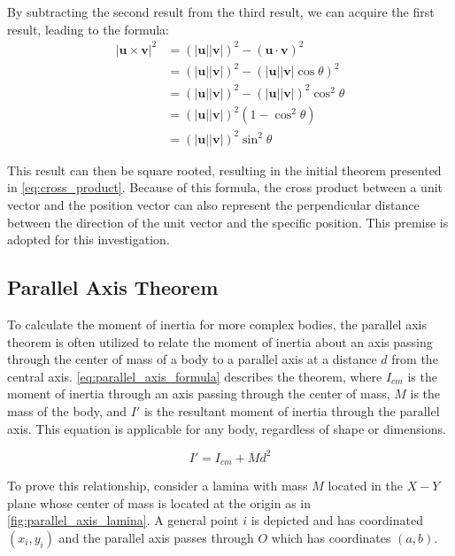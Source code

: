By subtracting the second result from the third result, we can acquire the first result, leading to the formula:
\begin{align*}
|\bm{u} \times \bm{v}|^2 &= (|\bm{u}||\bm{v}|)^2 - (\bm{u} \cdot \bm{v})^2 \\
&= (|\bm{u}||\bm{v}|)^2 - (|\bm{u}||\bm{v}|\cos{\theta})^2 \\
&= (|\bm{u}||\bm{v}|)^2 - (|\bm{u}||\bm{v}|)^2\cos^2{\theta} \\
&= (|\bm{u}||\bm{v}|)^2(1 - \cos^2{\theta}) \\
&= (|\bm{u}||\bm{v}|)^2\sin^2{\theta}
\end{align*}

This result can then be square rooted, resulting in the initial theorem presented in \cref{eq:cross_product}. Because of this formula, the cross product between a unit vector and the position vector can also represent the perpendicular distance between the direction of the unit vector and the specific position. This premise is adopted for this investigation.

\subsection{Parallel Axis Theorem}

To calculate the moment of inertia for more complex bodies, the parallel axis theorem is often utilized to relate the moment of inertia about an axis passing through the center of mass of a body to a parallel axis at a distance $d$ from the central axis. \cref{eq:parallel_axis_formula} describes the theorem, where $I_{cm}$ is the moment of inertia through an axis passing through the center of mass, $M$ is the mass of the body, and $I'$ is the resultant moment of inertia through the parallel axis. This equation is applicable for any body, regardless of shape or dimensions.

\begin{equation}
I' = I_{cm} + Md^2
\label{eq:parallel_axis_formula}
\end{equation}

To prove this relationship, consider a lamina with mass $M$ located in the $X-Y$ plane whose center of mass is located at the origin as in \cref{fig:parallel_axis_lamina}. A general point $i$ is depicted and has coordinated $(x_i, y_i)$ and the parallel axis passes through $O$ which has coordinates $(a, b)$.

 

